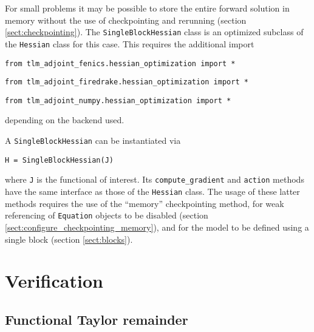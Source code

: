 \documentclass[11pt]{article}
\begin{document}
For small problems it may be possible to store the entire forward solution in
memory without the use of checkpointing and rerunning (section
\ref{sect:checkpointing}). The \texttt{SingleBlockHessian} class is an
optimized subclass of the \texttt{Hessian} class for this case. This requires
the additional import
\begin{lstlisting}
from tlm_adjoint_fenics.hessian_optimization import *
\end{lstlisting}
\begin{lstlisting}
from tlm_adjoint_firedrake.hessian_optimization import *
\end{lstlisting}
\begin{lstlisting}
from tlm_adjoint_numpy.hessian_optimization import *
\end{lstlisting}
depending on the backend used.

A \texttt{SingleBlockHessian} can be instantiated via
\begin{lstlisting}
H = SingleBlockHessian(J)
\end{lstlisting}
where \texttt{J} is the functional of interest. Its \texttt{compute\_gradient}
and \texttt{action} methods have the same interface as those of the
\texttt{Hessian} class. The usage of these latter methods requires the use of
the ``memory'' checkpointing method, for weak referencing of \texttt{Equation}
objects to be disabled (section \ref{sect:configure_checkpointing_memory}), and
for the model to be defined using a single block (section \ref{sect:blocks}).

\section{Verification}\label{sect:verification}

\subsection{Functional Taylor remainder}
\end{document}
